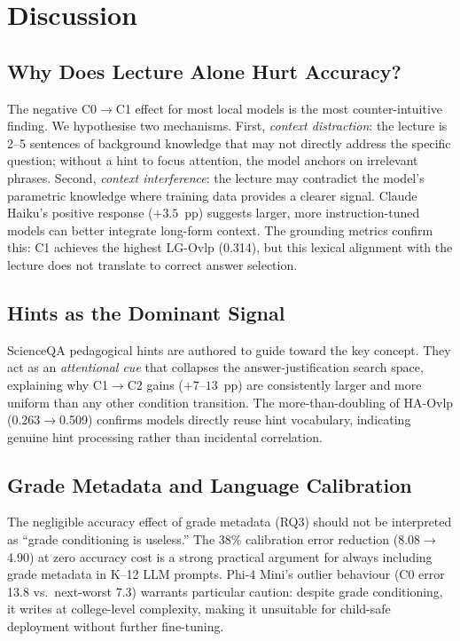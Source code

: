 \documentclass[journal]{IEEEtran}
\begin{document}
\section{Discussion}
\label{sec:discussion}

\subsection{Why Does Lecture Alone Hurt Accuracy?}

The negative C0$\to$C1 effect for most local models is the most counter-intuitive
finding. We hypothesise two mechanisms. First, \emph{context distraction}: the
lecture is 2--5 sentences of background knowledge that may not directly address
the specific question; without a hint to focus attention, the model anchors on
irrelevant phrases. Second, \emph{context interference}: the lecture may
contradict the model's parametric knowledge where training data provides a
clearer signal. Claude Haiku's positive response ($+3.5$~pp) suggests larger,
more instruction-tuned models can better integrate long-form context. The
grounding metrics confirm this: C1 achieves the highest LG-Ovlp (0.314), but
this lexical alignment with the lecture does not translate to correct answer
selection.

\subsection{Hints as the Dominant Signal}

ScienceQA pedagogical hints are authored to guide toward the key concept.
They act as an \emph{attentional cue} that collapses the answer-justification
search space, explaining why C1$\to$C2 gains ($+7$--$13$~pp) are consistently
larger and more uniform than any other condition transition. The more-than-doubling
of HA-Ovlp (0.263$\to$0.509) confirms models directly reuse hint vocabulary,
indicating genuine hint processing rather than incidental correlation.

\subsection{Grade Metadata and Language Calibration}

The negligible accuracy effect of grade metadata (RQ3) should not be interpreted
as ``grade conditioning is useless.'' The 38\% calibration error reduction
(8.08$\to$4.90) at zero accuracy cost is a strong practical argument for always
including grade metadata in K--12 LLM prompts. Phi-4 Mini's outlier behaviour
(C0 error 13.8 vs.\ next-worst 7.3) warrants particular caution: despite
grade conditioning, it writes at college-level complexity, making it unsuitable
for child-safe deployment without further fine-tuning.
\end{document}
